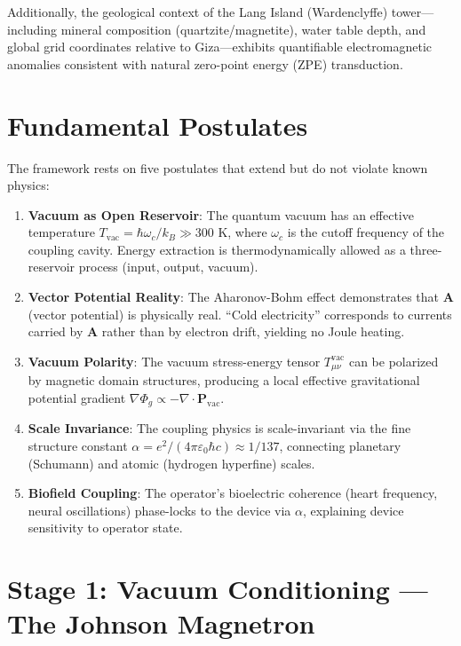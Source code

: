 \documentclass[11pt, twocolumn]{article}
\begin{document}
Additionally, the geological context of the Lang Island (Wardenclyffe) tower---including mineral composition (quartzite/magnetite), water table depth, and global grid coordinates relative to Giza---exhibits quantifiable electromagnetic anomalies consistent with natural zero-point energy (ZPE) transduction.

\section{Fundamental Postulates}
\label{sec:postulates}

The framework rests on five postulates that extend but do not violate known physics:

\begin{enumerate}
    \item \textbf{Vacuum as Open Reservoir}: The quantum vacuum has an effective temperature $T_{\text{vac}} = \hbar\omega_c/k_B \gg 300$ K, where $\omega_c$ is the cutoff frequency of the coupling cavity. Energy extraction is thermodynamically allowed as a three-reservoir process (input, output, vacuum).
    
    \item \textbf{Vector Potential Reality}: The Aharonov-Bohm effect demonstrates that $\mathbf{A}$ (vector potential) is physically real. ``Cold electricity'' corresponds to currents carried by $\mathbf{A}$ rather than by electron drift, yielding no Joule heating.
    
    \item \textbf{Vacuum Polarity}: The vacuum stress-energy tensor $T_{\mu\nu}^{\text{vac}}$ can be polarized by magnetic domain structures, producing a local effective gravitational potential gradient $\nabla \Phi_g \propto -\nabla \cdot \mathbf{P}_{\text{vac}}$.
    
    \item \textbf{Scale Invariance}: The coupling physics is scale-invariant via the fine structure constant $\alpha = e^2/(4\pi\varepsilon_0 \hbar c) \approx 1/137$, connecting planetary (Schumann) and atomic (hydrogen hyperfine) scales.
    
    \item \textbf{Biofield Coupling}: The operator's bioelectric coherence (heart frequency, neural oscillations) phase-locks to the device via $\alpha$, explaining device sensitivity to operator state.
\end{enumerate}

\section{Stage 1: Vacuum Conditioning --- The Johnson Magnetron}
\label{sec:stage1}
\end{document}
